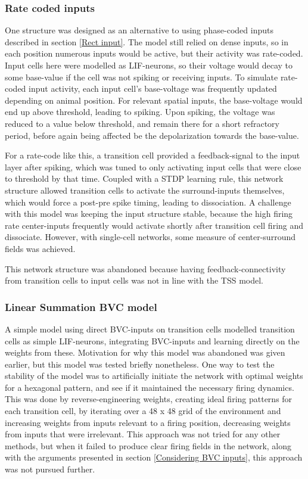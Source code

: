 \documentclass{article}
\begin{document}
    \subsubsection{Rate coded inputs} \label{Rate input}
    One structure was designed as an alternative to using phase-coded inputs described in section \ref{Rect input}. The model still relied on dense inputs, so in each position numerous inputs would be active, but their activity was rate-coded. Input cells here were modelled as LIF-neurons, so their voltage would decay to some base-value if the cell was not spiking or receiving inputs. To simulate rate-coded input activity, each input cell's base-voltage was frequently updated depending on animal position. For relevant spatial inputs, the base-voltage would end up above threshold, leading to spiking. Upon spiking, the voltage was reduced to a value below threshold, and remain there for a short refractory period, before again being affected be the depolarization towards the base-value.

    For a rate-code like this, a transition cell provided a feedback-signal to the input layer after spiking, which was tuned to only activating input cells that were close to threshold by that time. Coupled with a STDP learning rule, this network structure allowed transition cells to activate the surround-inputs themselves, which would force a post-pre spike timing, leading to dissociation. A challenge with this model was keeping the input structure stable, because the high firing rate center-inputs frequently would activate shortly after transition cell firing and dissociate. However, with single-cell networks, some measure of center-surround fields was achieved.

    This network structure was abandoned because having feedback-connectivity from transition cells to input cells was not in line with the TSS model.

    \subsubsection{Linear Summation BVC model} \label{LinnSummBVC}
    
    A simple model using direct BVC-inputs on transition cells modelled transition cells as simple LIF-neurons, integrating BVC-inputs and learning directly on the weights from these. Motivation for why this model was abandoned was given earlier, but this model was tested briefly nonetheless. One way to test the stability of the model was to artificially initiate the network with optimal weights for a hexagonal pattern, and see if it maintained the necessary firing dynamics. This was done by reverse-engineering weights, creating ideal firing patterns for each transition cell, by iterating over a 48 x 48 grid of the environment and increasing weights from inputs relevant to a firing position, decreasing weights from inputs that were irrelevant. This approach was not tried for any other methods, but when it failed to produce clear firing fields in the network, along with the arguments presented in section \ref{Considering BVC inputs}, this approach was not pursued further.
\end{document}

